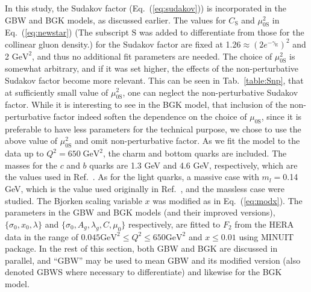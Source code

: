 \documentclass[11pt]{article}
\begin{document}
In this study, the Sudakov factor (Eq.~(\ref{eq:sudakov})) is incorporated in the GBW and BGK models, as discussed earlier. %
The values for $C_\mathrm{S}$ and $\mu_{0\mathrm{S}}^2$ in Eq.~(\ref{eq:newstar}) (The subscript $\mathrm{S}$ was added to differentiate from those for the collinear gluon density.) for the Sudakov factor are fixed at 1.26$\approx (2e^{-\gamma_\mathrm{E}})^2$ and 2 $\mathrm{GeV^2}$, and thus no additional fit parameters are needed. The choice of $\mu_{0\mathrm{S}}^2$  is somewhat arbitrary, and if it was set higher, the effects of the non-perturbative Sudakov factor become more relevant. {\color{blue}This can be seen in Tab.~\ref{table:Snp}, that at sufficiently small value of $\mu_{0\mathrm{S}}^2$, one can neglect the non-perturbative Sudakov factor. While it is interesting to see in the BGK model, that inclusion of the non-perturbative factor indeed soften the dependence on the choice of $\mu_{0\mathrm{S}}$, since it is preferable to have less parameters for the technical purpose, we chose to use the above value of $\mu_{0\mathrm{S}}^2$ and omit non-perturbative factor.}
As we fit the model to the data up to $Q^2=650\;\mathrm{GeV^2}$, the charm and bottom quarks are included.  
The masses for the $c$ and $b$ quarks are 1.3 GeV and 4.6 GeV, respectively, which are the values used in Ref.~\cite{gbs2018}. As for the light quarks, a massive case with $m_l=$0.14 GeV, which is the value used originally in Ref.~\cite{gbw1998}, and the massless case were studied.  The Bjorken scaling variable $x$ was modified as in Eq.~(\ref{eq:modx}). %
The parameters in the GBW and BGK models (and their improved versions), $\{\sigma_0, x_0, \lambda\}$ and  $\{\sigma_0, A_g, \lambda_g, C, \mu_0\}$ respectively, are fitted to $F_2$ from the HERA data\cite{hera} in the range of $0.045\mathrm{GeV^2} \leq Q^2\leq 650 \mathrm{GeV^2}$ and $x \leq0.01$ using MINUIT\cite{minuit} package. %
In the rest of this section, both GBW and BGK are discussed in parallel, and ``GBW'' may be used to mean GBW and its modified version (also denoted GBWS where necessary to differentiate) and likewise for the BGK model.
\end{document}

